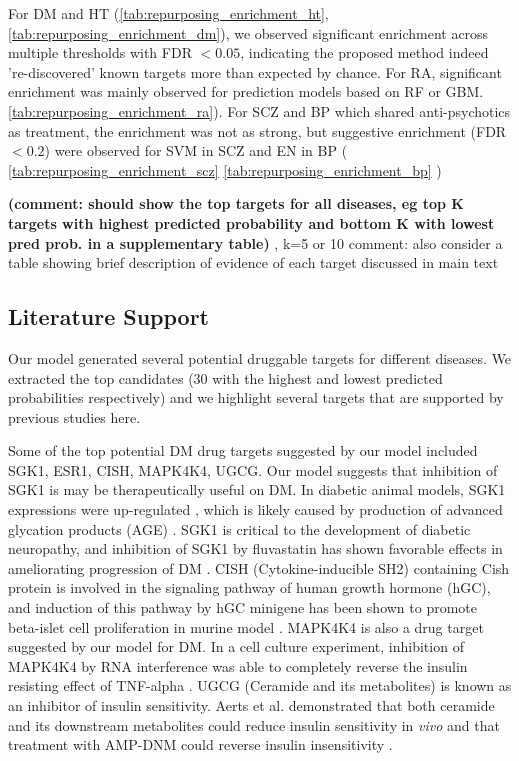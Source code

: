     For DM and HT (\ref{tab:repurposing_enrichment_ht}, \ref{tab:repurposing_enrichment_dm}), we observed significant enrichment across multiple thresholds with FDR $< 0.05$, indicating the proposed method indeed 're-discovered' known targets more than expected by chance. For RA, significant enrichment was mainly observed for prediction models based on RF or GBM. \ref{tab:repurposing_enrichment_ra}). For SCZ and BP which shared anti-psychotics as treatment, the enrichment was not as strong, but suggestive enrichment (FDR $< 0.2 $) were observed for SVM in SCZ and EN in BP ( \ref{tab:repurposing_enrichment_scz}  \ref{tab:repurposing_enrichment_bp} )
     
    \textbf{(comment: should show the top targets for all diseases, eg top K targets with highest predicted probability and bottom K with lowest pred prob. in a supplementary table)} , k=5 or 10
    comment: also consider a table showing brief description of evidence of each target discussed in main text 

  \subsection{Literature Support}
    Our model generated several potential druggable targets for different diseases. We extracted the top candidates (30 with the highest and lowest predicted probabilities respectively) and we highlight several targets that are supported by previous studies here. 

    Some of the top potential DM drug targets  suggested by our model  included SGK1, ESR1, CISH, MAPK4K4, UGCG. Our model suggests that inhibition of  SGK1 is may be therapeutically useful on DM. In diabetic animal models, SGK1 expressions were up-regulated \cite{hills2006high, xuebin2005expression,chang2007enhancement}, which is likely caused by production of advanced glycation products (AGE) \cite{hills2006high,chang2007enhancement}. SGK1 is critical to the development of diabetic neuropathy, and inhibition of SGK1 by fluvastatin has shown favorable effects in ameliorating progression of DM \cite{xuebin2005expression}.  CISH (Cytokine-inducible SH2) containing Cish protein is involved in the signaling pathway of  human growth hormone (hGC), and induction of this pathway by hGC minigene has been shown to promote beta-islet cell proliferation in murine model \cite{baan2015transgenic}. MAPK4K4 is also a drug target suggested by our model for DM. In a cell culture experiment, inhibition of MAPK4K4 by RNA interference was able to completely reverse the insulin resisting effect of TNF-alpha \cite{bouzakri2007map4k4}. UGCG (Ceramide and its metabolites) is known as an inhibitor of insulin sensitivity. Aerts et al. demonstrated that both ceramide and its downstream metabolites could reduce insulin sensitivity in\textit{ vivo} and that treatment with AMP-DNM could reverse insulin insensitivity \cite{aerts2007pharmacological}. 
  
